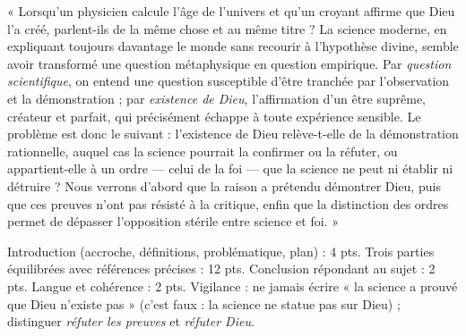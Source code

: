 \documentclass[11pt]{article}
\begin{document}
\begin{corrige}
« Lorsqu'un physicien calcule l'âge de l'univers et qu'un croyant affirme que Dieu l'a créé, parlent-ils de la même chose et au même titre ? La science moderne, en expliquant toujours davantage le monde sans recourir à l'hypothèse divine, semble avoir transformé une question métaphysique en question empirique. Par \emph{question scientifique}, on entend une question susceptible d'être tranchée par l'observation et la démonstration ; par \emph{existence de Dieu}, l'affirmation d'un être suprême, créateur et parfait, qui précisément échappe à toute expérience sensible. Le problème est donc le suivant : l'existence de Dieu relève-t-elle de la démonstration rationnelle, auquel cas la science pourrait la confirmer ou la réfuter, ou appartient-elle à un ordre — celui de la foi — que la science ne peut ni établir ni détruire ? Nous verrons d'abord que la raison a prétendu démontrer Dieu, puis que ces preuves n'ont pas résisté à la critique, enfin que la distinction des ordres permet de dépasser l'opposition stérile entre science et foi. »
\end{corrige}
\begin{attention}
Introduction (accroche, définitions, problématique, plan) : 4 pts. Trois parties équilibrées avec références précises : 12 pts. Conclusion répondant au sujet : 2 pts. Langue et cohérence : 2 pts. Vigilance : ne jamais écrire « la science a prouvé que Dieu n'existe pas » (c'est faux : la science ne statue pas sur Dieu) ; distinguer \emph{réfuter les preuves} et \emph{réfuter Dieu}.
\end{attention}
\end{document}
